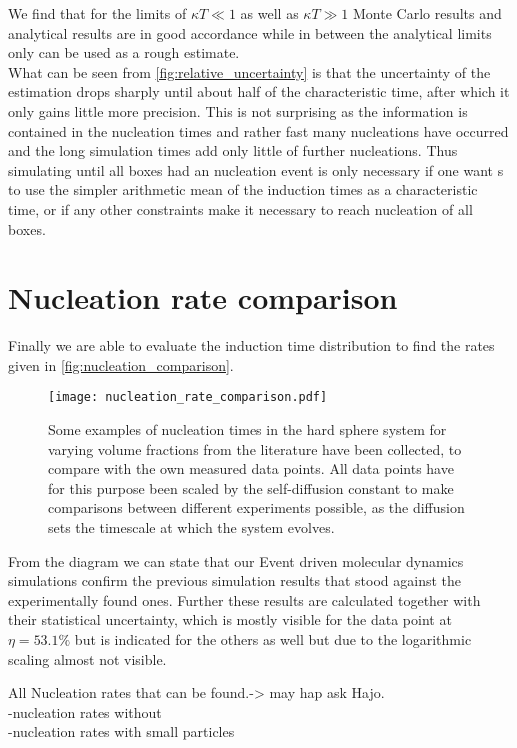 We find that for the limits of $\kappa T \ll 1$ as well as $\kappa T \gg 1$ Monte Carlo results and analytical results are in good accordance while in between the analytical limits only can be used as a rough estimate.\\

What can be seen from \autoref{fig:relative_uncertainty} is that the uncertainty of the estimation drops sharply until about half of the characteristic time, after which it only gains little more precision. This is not surprising as the information is contained in the nucleation times and rather fast many nucleations have occurred and the long simulation times add only little of further nucleations. Thus simulating until all boxes had an nucleation event is only necessary if one want s to use the simpler arithmetic mean of the induction times as a characteristic time, or if any other constraints make it necessary to reach nucleation of all boxes.

\section{Nucleation rate comparison}
\label{sec:nucleation_rates}
Finally we are able to evaluate the induction time distribution to find the rates given in \autoref{fig:nucleation_comparison}.

\begin{figure}[h!]
\centering
\texttt{[image: nucleation\_rate\_comparison.pdf]}
\caption[Nucleation rate comparison with literature values]{Some examples of nucleation times in the hard sphere system for varying volume fractions from the literature have been collected, to compare with the own measured data points. All data points have for this purpose been scaled by the self-diffusion constant to make comparisons between different experiments possible, as the diffusion sets the timescale at which the system evolves.}
\label{fig:nucleation_comparison}
\end{figure}

From the diagram we can state that our Event driven molecular dynamics simulations confirm the previous simulation results that stood against the experimentally found ones. Further these results are calculated together with their statistical uncertainty, which is mostly visible for the data point at $\eta = 53.1 \%$ but is indicated for the others as well but due to the logarithmic scaling almost not visible.

All Nucleation rates that can be found.-> may hap ask Hajo.\\
-nucleation rates without\\
-nucleation rates with small particles\\


